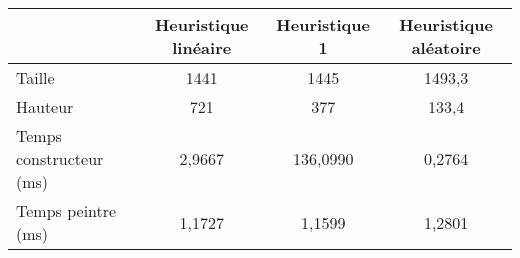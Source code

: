 \begin{center}
{\tabulinesep=1.2mm
\begin{tabu}{|l|c|c|c|}
  \hline
  & Heuristique linéaire  & Heuristique 1 & Heuristique aléatoire \\ 
  \hline
  Taille &      1441&      1445&    1493,3  \\ 
  \hline
  Hauteur &       721&       377&     133,4  \\ 
  \hline
  Temps constructeur (ms) &          2,9667&        136,0990&          0,2764  \\ 
  \hline
  Temps peintre (ms) &            1,1727&           1,1599&           1,2801  \\ 
  \hline
\end{tabu}
}
\end{center}

